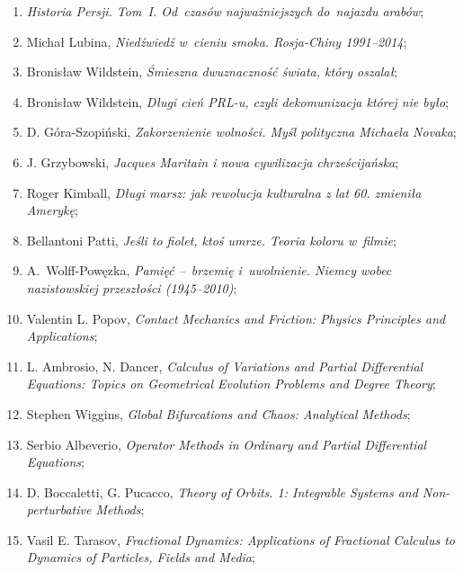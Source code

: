 \documentclass[a4paper,11pt]{article}
\begin{document}
\begin{enumerate}
\item \emph{Historia Persji. Tom~I. Od~czasów najważniejszych
    do~najazdu arabów};

\item Michał Lubina, \emph{Niedźwiedź w~cieniu smoka. Rosja-Chiny
    1991--2014};

\item Bronisław Wildstein, \emph{Śmieszna dwuznaczność świata, który
    oszalał};

\item Bronisław Wildstein, \emph{Długi cień PRL-u, czyli dekomunizacja
    której nie było};

\item D. Góra-Szopiński, \emph{Zakorzenienie wolności. Myśl polityczna
    Michaela Novaka};

\item J. Grzybowski, \emph{Jacques Maritain i nowa cywilizacja
    chrześcijańska};

\item Roger Kimball, \emph{Długi marsz: jak rewolucja kulturalna z lat
    60. zmieniła Amerykę};

\item Bellantoni Patti, \emph{Jeśli to fiolet, ktoś umrze. Teoria
    koloru w~filmie};

\item A.~Wolff-Powęzka, \emph{Pamięć --~brzemię i~uwolnienie. Niemcy
    wobec nazistowskiej przeszłości (1945--2010)};

\item Valentin L. Popov, \emph{Contact Mechanics and Friction: Physics
    Principles and Applications};

\item L. Ambrosio, N. Dancer, \emph{Calculus of Variations and Partial
    Differential Equations: Topics on Geometrical Evolution Problems
    and Degree Theory};

\item Stephen Wiggins, \emph{Global Bifurcations and Chaos: Analytical
    Methods};

\item Serbio Albeverio, \emph{Operator Methods in Ordinary and Partial
    Differential Equations};

\item D. Boccaletti, G. Pucacco, \emph{Theory of Orbits. 1: Integrable
    Systems and Non-perturbative Methods};

\item Vasil E. Tarasov, \emph{Fractional Dynamics: Applications of
    Fractional Calculus to Dynamics of Particles, Fields and Media};


\end{enumerate}
\end{document}
